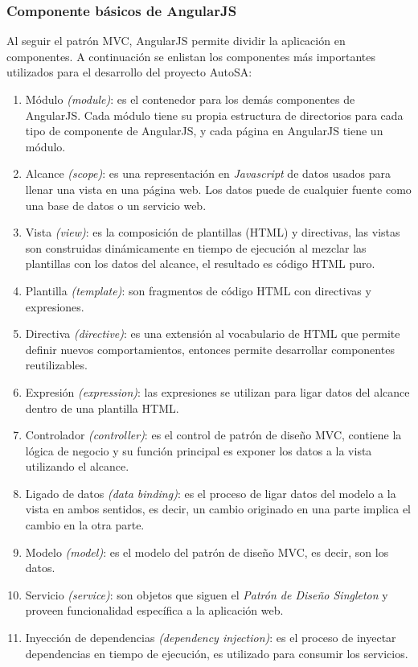 \subsubsection{Componente básicos de AngularJS}
Al seguir el patrón MVC, AngularJS permite dividir la aplicación en componentes. A continuación se enlistan los componentes más importantes utilizados para el desarrollo del proyecto AutoSA\cite{FullStackAngularJS, LearningAngularJS, AngularJSEssentials}:
\begin{enumerate}
	\item Módulo \textit{(module)}: es el contenedor para los demás componentes de AngularJS. Cada módulo tiene su propia estructura de directorios para cada tipo de componente de AngularJS, y cada página en AngularJS tiene un módulo.
	\item Alcance \textit{(scope)}: es una representación en \textit{Javascript} de datos usados para llenar una vista en una página web. Los datos puede de cualquier fuente como una base de datos o un servicio web.
	\item Vista \textit{(view)}: es la composición de plantillas (HTML) y directivas, las vistas son construidas dinámicamente en tiempo de ejecución al mezclar las plantillas con los datos del alcance, el resultado es código HTML puro.
	\item Plantilla \textit{(template)}: son fragmentos de código HTML con directivas y expresiones.
	\item Directiva \textit{(directive)}: es una extensión al vocabulario de HTML que permite definir nuevos comportamientos, entonces permite desarrollar componentes reutilizables.
	\item Expresión \textit{(expression)}: las expresiones se utilizan para ligar datos del alcance dentro de una plantilla HTML.
	\item Controlador \textit{(controller)}: es el control de patrón de diseño MVC, contiene la lógica de negocio y su función principal es exponer los datos a la vista utilizando el alcance.
	\item Ligado de datos \textit{(data binding)}: es el proceso de ligar datos del modelo a la vista en ambos sentidos, es decir, un cambio originado en una parte implica el cambio en la otra parte.
	\item Modelo \textit{(model)}: es el modelo del patrón de diseño MVC, es decir, son los datos.
	\item Servicio \textit{(service)}: son objetos que siguen el \textit{Patrón de Diseño Singleton} y proveen funcionalidad específica a la aplicación web.
	\item Inyección de dependencias \textit{(dependency injection)}: es el proceso de inyectar dependencias en tiempo de ejecución, es utilizado para consumir los servicios.
\end{enumerate}

